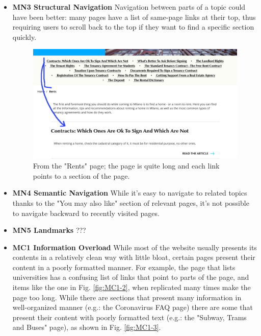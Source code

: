 \begin{itemize}
    \item \textbf{MN3 Structural Navigation}
    Navigation between parts of a topic could have been better: many pages have a list of same-page links at their top, thus requiring users to scroll back to the top if they want to find a specific section quickly. 

    \begin{figure}[!ht]
        \includegraphics[width=\linewidth]{images/MN3-1.png}
        \caption{From the "Rents" page; the page is quite long and each link points to a section of the page.}
        \label{fig:MN3-1}
    \end{figure}
      
    \item \textbf{MN4 Semantic Navigation}
    While it's easy to navigate to related topics thanks to the "You may also like" section of relevant pages, it's not possible to navigate backward to recently visited pages.

    \item \textbf{MN5 Landmarks}
    ???
    
    \item \textbf{MC1 Information Overload}
    While most of the website usually presents its contents in a relatively clean way with little bloat, certain pages present their content in a poorly formatted manner. 
    For example, the page that lists universities has a confusing list of links that point to parts of the page, and items like the one in Fig. \ref{fig:MC1-2}, when replicated many times make the page too long.
    While there are sections that present many information in well-organized manner (e.g.: the Coronavirus FAQ page) there are some that present their content with poorly formatted text (e.g.: the "Subway, Trams and Buses" page), as shown in Fig. \ref{fig:MC1-3}.



\end{itemize}
